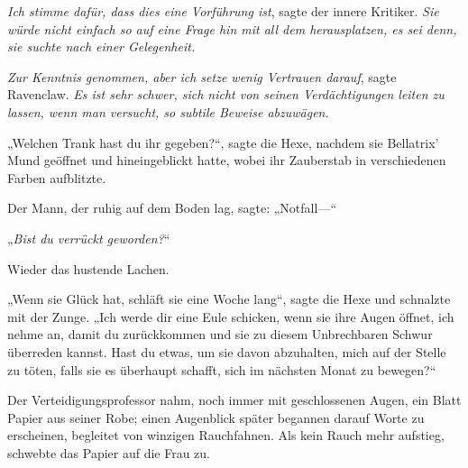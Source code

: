 \emph{Ich stimme dafür, dass dies eine Vorführung ist}, sagte der innere Kritiker. \emph{Sie würde nicht einfach so auf eine Frage hin mit all dem herausplatzen, es sei denn, sie suchte nach einer Gelegenheit.}

\emph{Zur Kenntnis genommen, aber ich setze wenig Vertrauen darauf}, sagte Ravenclaw. \emph{Es ist sehr schwer, sich nicht von seinen Verdächtigungen leiten zu lassen, wenn man versucht, so subtile Beweise abzuwägen.}

„Welchen Trank hast du ihr gegeben?“, sagte die Hexe, nachdem sie Bellatrix’ Mund geöffnet und hineingeblickt hatte, wobei ihr Zauberstab in verschiedenen Farben aufblitzte.

Der Mann, der ruhig auf dem Boden lag, sagte:
„Notfall—“

„\emph{Bist du verrückt geworden?}“

Wieder das hustende Lachen.

„Wenn sie Glück hat, schläft sie eine Woche lang“, sagte die Hexe und schnalzte mit der Zunge.
„Ich werde dir eine Eule schicken, wenn sie ihre Augen öffnet, ich nehme an, damit du zurückkommen und sie zu diesem Unbrechbaren Schwur überreden kannst. Hast du etwas, um sie davon abzuhalten, mich auf der Stelle zu töten, falls sie es überhaupt schafft, sich im nächsten Monat zu bewegen?“

Der Verteidigungsprofessor nahm, noch immer mit geschlossenen Augen, ein Blatt Papier aus seiner Robe; einen Augenblick später begannen darauf Worte zu erscheinen, begleitet von winzigen Rauchfahnen. Als kein Rauch mehr aufstieg, schwebte das Papier auf die Frau zu.

